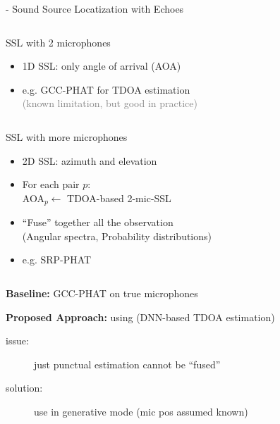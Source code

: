 \begin{frame}{\mirage - Sound Source Locatization with Echoes}

    \begin{columns}[T,onlytextwidth]
        \begin{block}{SSL with 2 microphones}
            \begin{itemize}
                \item 1D SSL: only angle of arrival (AOA)
                \item e.g. GCC-PHAT for TDOA estimation~\cite{knapp1976generalized}
                \\\textcolor{gray}{\small (known limitation, but good in practice)}
            \end{itemize}
        \end{block}
    \end{columns}

    \begin{columns}[T,onlytextwidth]
        \begin{block}{SSL with more microphones}
            \begin{itemize}
                \item 2D SSL: azimuth and elevation
                \item For each pair $p$:
                \\\hspace{1em} AOA$_p \gets$ TDOA-based 2-mic-SSL
                \item ``Fuse''  together all the observation
                \\(Angular spectra, Probability distributions)
                \item e.g. SRP-PHAT~\cite{dibiase2001robust}
            \end{itemize}
        \end{block}
    \end{columns}

    \textbf{Baseline:} GCC-PHAT on true microphones

    \textbf{Proposed Approach:} using \lantern (DNN-based TDOA estimation)
    \begin{description}
        \item[issue:] just punctual estimation cannot be ``fused''
        \item[solution:] use \lantern in generative mode (mic pos assumed known)
    \end{description}
\end{frame}

